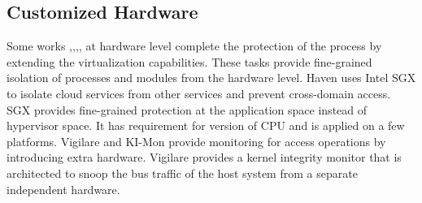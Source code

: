 \documentclass[conference]{IEEEtran}
\begin{document}

\subsection{Customized Hardware }
Some works \cite{haven},\cite{Lee2013KI},\cite{Moon2012Vigilare},\cite{Hoekstra13cuvillo,Mckeen2013Innovative,Cho2016Hardware}, at hardware level complete the protection of the process by extending the virtualization capabilities. These tasks provide fine-grained isolation of processes and modules from the hardware level. Haven \cite{haven} uses Intel SGX to isolate cloud services from other services and prevent cross-domain access. SGX provides fine-grained protection at the application space instead of hypervisor space.
It has requirement for version of CPU and is applied on a few platforms.
 Vigilare\cite{Moon2012Vigilare} and KI-Mon \cite{Lee2013KI} provide monitoring for access operations by introducing extra hardware. Vigilare provides a kernel integrity monitor that is architected to snoop the bus traffic of the host system from a separate independent hardware. 
\end{document}

